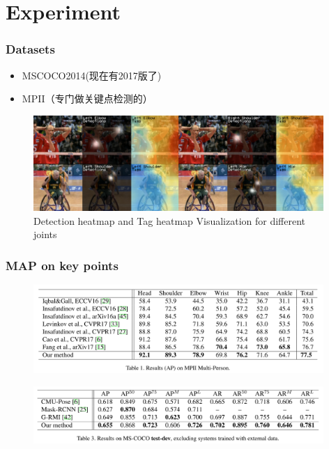 \documentclass{ctexbeamer}
\begin{document}
\section{Experiment}
\begin{frame}
  \frametitle{Datasets}
  \begin{itemize}
  \item MSCOCO2014(现在有2017版了)
  \item MPII（专门做关键点检测的）
 
  \end{itemize}
  \begin{figure}
    \includegraphics[width=11cm]{fig/hmvis-2.png}
      \caption{\label{fig:hmvis-2}Detection heatmap and Tag heatmap Visualization for different joints}
    \end{figure}

  \vskip 1cm
  \end{frame}
  \begin{frame}
    \frametitle{MAP on key points}
    \begin{figure}
      \includegraphics[width=11cm]{fig/table1.png}
        
      \end{figure}
      \begin{figure}
        \includegraphics[width=11cm]{fig/table3.png}
          
        \end{figure}
        \vskip 1cm
  \end{frame}
\end{document}
